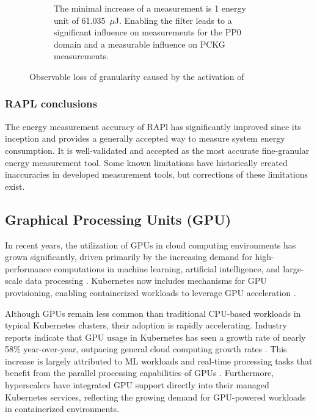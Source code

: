 \begin{itemize}
\begin{figure}[H]
\begin{subfigure}[t]{0.48\textwidth}
            \caption{The minimal increase of a measurement is 1 energy unit of 61.035~$\mu$J. Enabling the filter leads to a significant influence on measurements for the PP0 domain and a measurable influence on PCKG measurements.}
            \label{fig:rapl_filter_granularity_loss_energy}
        \end{subfigure}
        \caption[RAPL ]{Observable loss of granularity caused by the activation of \parencite{schone2024energy}}
        \label{fig:rapl_filter_granularity_loss}
    \end{figure}
\end{itemize}

\subsubsection{RAPL conclusions}

The energy measurement accuracy of RAPl has significantly improved since its inception and provides a generally accepted way to measure system energy consumption. It is well-validated and accepted as the most accurate fine-granular energy measurement tool. Some known limitations have historically created inaccuracies in developed measurement tools, but corrections of these limitations exist. 

\subsection{Graphical Processing Units (GPU)}
In recent years, the utilization of GPUs in cloud computing environments has grown significantly, driven primarily by the increasing demand for high-performance computations in machine learning, artificial intelligence, and large-scale data processing \cite{jouppi2017datacenter}. Kubernetes now includes mechanisms for GPU provisioning, enabling containerized workloads to leverage GPU acceleration \cite{k8s_gpu_support}.

Although GPUs remain less common than traditional CPU-based workloads in typical Kubernetes clusters, their adoption is rapidly accelerating. Industry reports indicate that GPU usage in Kubernetes has seen a growth rate of nearly 58\% year-over-year, outpacing general cloud computing growth rates \cite{datadog_report}. This increase is largely attributed to ML workloads and real-time processing tasks that benefit from the parallel processing capabilities of GPUs \cite{tensorflow_k8s}. Furthermore, hyperscalers have integrated GPU support directly into their managed Kubernetes services, reflecting the growing demand for GPU-powered workloads in containerized environments.

